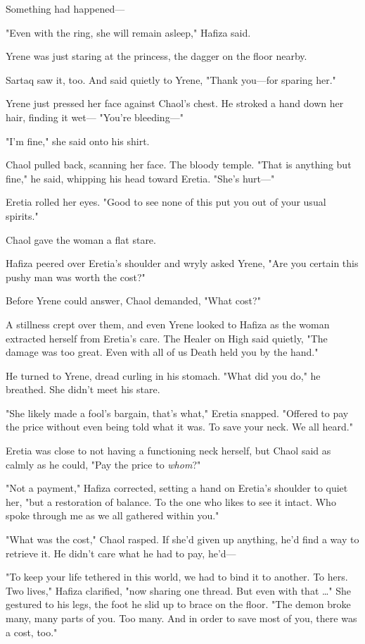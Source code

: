 Something had happened---

"Even with the ring, she will remain asleep," Hafiza said.

Yrene was just staring at the princess, the dagger on the floor nearby.

Sartaq saw it, too. And said quietly to Yrene, "Thank you---for sparing her."

Yrene just pressed her face against Chaol's chest. He stroked a hand down her hair, finding it wet--- "You're bleeding---"

"I'm fine," she said onto his shirt.

Chaol pulled back, scanning her face. The bloody temple. "That is anything but fine," he said, whipping his head toward Eretia. "She's hurt---"

Eretia rolled her eyes. "Good to see none of this put you out of your usual spirits."

Chaol gave the woman a flat stare.

Hafiza peered over Eretia's shoulder and wryly asked Yrene, "Are you certain this pushy man was worth the cost?"

Before Yrene could answer, Chaol demanded, "What cost?"

A stillness crept over them, and even Yrene looked to Hafiza as the woman extracted herself from Eretia's care. The Healer on High said quietly, "The damage was too great. Even with all of us  Death held you by the hand."

He turned to Yrene, dread curling in his stomach. "What did you do," he breathed. She didn't meet his stare.

"She likely made a fool's bargain, that's what," Eretia snapped. "Offered to pay the price without even being told what it was. To save your neck. We all heard."

Eretia was close to not having a functioning neck herself, but Chaol said as calmly as he could, "Pay the price to \emph{whom}?"

"Not a payment," Hafiza corrected, setting a hand on Eretia's shoulder to quiet her, "but a restoration of balance. To the one who likes to see it intact. Who spoke through me as we all gathered within you."

"What was the cost," Chaol rasped. If she'd given up anything, he'd find a way to retrieve it. He didn't care what he had to pay, he'd---

"To keep your life tethered in this world, we had to bind it to another. To hers. Two lives," Hafiza clarified, "now sharing one thread. But even with that \ldots" She gestured to his legs, the foot he slid up to brace on the floor. "The demon broke many, many parts of you. Too many. And in order to save most of you, there was a cost, too."

